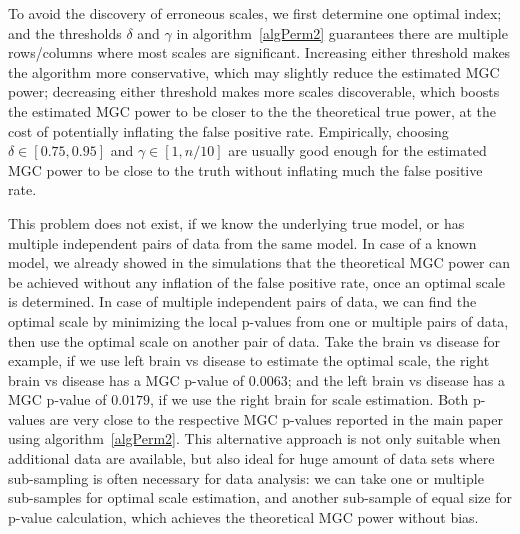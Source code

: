 \documentclass[11pt]{article}
\begin{document}
To avoid the discovery of erroneous scales, we first determine one optimal index; and the thresholds $\delta$ and $\gamma$ in algorithm~\ref{algPerm2} guarantees there are multiple rows/columns where most scales are significant. Increasing either threshold makes the algorithm more conservative, which may slightly reduce the estimated MGC power; decreasing either threshold makes more scales discoverable, which boosts the estimated MGC power to be closer to the the theoretical true power, at the cost of potentially inflating the false positive rate. Empirically, choosing $\delta \in [0.75,0.95]$ and $\gamma \in [1,n/10]$ are usually good enough for the estimated MGC power to be close to the truth without inflating much the false positive rate.

This problem does not exist, if we know the underlying true model, or has multiple independent pairs of data from the same model. In case of a known model, we already showed in the simulations that the theoretical MGC power can be achieved without any inflation of the false positive rate, once an optimal scale is determined. In case of multiple independent pairs of data, we can find the optimal scale by minimizing the local p-values from one or multiple pairs of data, then use the optimal scale on another pair of data. Take the brain vs disease for example, if we use left brain vs disease to estimate the optimal scale, the right brain vs disease has a MGC p-value of $0.0063$; and the left brain vs disease has a MGC p-value of $0.0179$, if we use the right brain for scale estimation. Both p-values are very close to the respective MGC p-values reported in the main paper using algorithm~\ref{algPerm2}. This alternative approach is not only suitable when additional data are available, but also ideal for huge amount of data sets where sub-sampling is often necessary for data analysis: we can take one or multiple sub-samples for optimal scale estimation, and another sub-sample of equal size for p-value calculation, which achieves the theoretical MGC power without bias.
\end{document}
